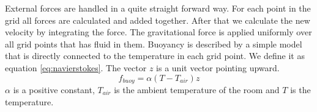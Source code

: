 External forces are handled in a quite straight forward way. 
For each point in the grid all forces are calculated and added together. 
After that we calculate the new velocity by integrating the force.
The gravitational force is applied uniformly over all grid points that has fluid in them.
Buoyancy is described by a simple model that is directly connected to the temperature in each grid point.
We define it as equation \ref{eq:navierstokes}.
The vector $z$ is a unit vector pointing upward. 
\begin{equation}
\label{eq:buoyancy}
f_{buoy} = \alpha(T-T_{air})z
\end{equation}
$\alpha$ is a positive constant, $T_{air}$ is the ambient temperature of the room and $T$ is the temperature. 
